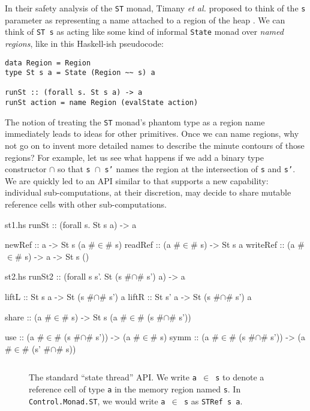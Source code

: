 \documentclass[format=sigplan, review=false, screen=true, 10pt]{acmart}
\begin{document}
In their safety analysis of the \texttt{ST} monad, Timany \textit{et al.} proposed to think of the \texttt{s} parameter as
representing a name attached to a region of the heap \cite{timany2017logical}.
We can think of \texttt{ST s} as acting like some kind of informal \texttt{State} monad over
\emph{named regions}, like in this Haskell-ish pseudocode:
\begin{verbatim}
data Region = Region
type St s a = State (Region ~~ s) a

runSt :: (forall s. St s a) -> a
runSt action = name Region (evalState action)
\end{verbatim}

The notion of treating the \texttt{ST} monad's phantom type as a region name immediately leads to ideas for
other primitives. Once we can name regions, why not go on to invent more detailed names to describe
the minute contours of those regions? For example, let us see what happens if we add a binary type constructor $\cap$ so that \texttt{s $\cap$ s'}
names the region at the intersection of \texttt{s} and \texttt{s'}. We are quickly led to an API similar to  that
supports a new capability: individual sub-computations, at their discretion, may decide to share mutable reference cells with other sub-computations.



\begin{filecontents*}{st1.hs}
runSt    :: (forall s. St s a) -> a

newRef   :: a -> St s (a #$\in$# s)
readRef  :: (a #$\in$# s) -> St s a
writeRef :: (a #$\in$# s) -> a -> St s ()
\end{filecontents*}

\begin{filecontents*}{st2.hs}
runSt2 :: (forall s s'. St (s #$\cap$# s') a) -> a

liftL :: St s a -> St (s #$\cap$# s') a
liftR :: St s' a -> St (s #$\cap$# s') a

share :: (a #$\in$# s) -> St s (a #$\in$# (s #$\cap$# s'))

use  :: (a #$\in$# (s #$\cap$# s')) -> (a #$\in$# s)
symm :: (a #$\in$# (s #$\cap$# s')) -> (a #$\in$# (s' #$\cap$# s))
\end{filecontents*}

\begin{figure}[t]
  \inputminted{haskell}{st1.hs}
  \caption{The standard ``state thread'' API. We write \texttt{a $\in$ s} to
    denote a reference cell of type \texttt{a} in the memory region named \texttt{s}.
    In \texttt{Control.Monad.ST}, we would write \texttt{a $\in$ s} as
    \texttt{STRef s a}.\label{st-api}}
\end{figure}
\end{document}
